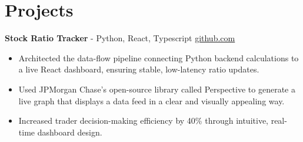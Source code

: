 \documentclass[11pt]{article}       %
\begin{document}

\vspace{-18.5pt}

\section*{Projects}

\textbf{Stock Ratio Tracker}{ - Python, React, Typescript} \hfill \href{https://github.com/Monica20030707/tradingDashboard-UI}{github.com} \\
\vspace{-9pt}
\begin{itemize}
  \item Architected the data-flow pipeline connecting Python backend calculations to a live React dashboard, ensuring stable, low-latency ratio updates. 
  \item Used JPMorgan Chase’s open-source library called Perspective to generate a live graph that displays a data feed in a clear and visually appealing way.
  \item Increased trader decision-making efficiency by 40\% through intuitive, real-time dashboard design.
\end{itemize}

\end{document}
